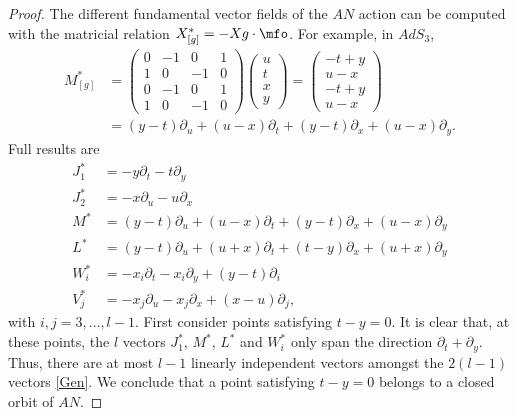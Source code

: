\begin{proof}
	The different fundamental vector fields of the $AN$ action can be computed with the matricial relation $X^*_{[g]}=-Xg\cdot\mfo$. For example, in $AdS_3$,
	\[
		\begin{split}
			M^*_{[g]} & =
			\begin{pmatrix}
				0 & -1 & 0  & 1 \\
				1 & 0  & -1 & 0 \\
				0 & -1 & 0  & 1 \\
				1 & 0  & -1 & 0
			\end{pmatrix}
			\begin{pmatrix}
				u \\t\\x\\y
			\end{pmatrix}
			=
			\begin{pmatrix}
				-t+y \\u-x\\-t+y\\u-x
			\end{pmatrix}                                                          \\
			          & =(y-t)\partial_u+(u-x)\partial_t+(y-t)\partial_x+(u-x)\partial_y.
		\end{split}
	\]
	Full results are
	\begin{subequations}\label{Gen}
		\begin{align}
			J_1^* & =-y\partial_t-t\partial_y							\label{EqNormeJun}                                            \\
			J_2^* & =-x\partial_u-u\partial_x                                                      \label{eq:Jds} \\
			M^*   & =(y-t)\partial_u+(u-x)\partial_t+(y-t)\partial_x+(u-x)\partial_y                              \\
			L^*   & =(y-t)\partial_u+(u+x)\partial_t+(t-y)\partial_x+(u+x)\partial_y                              \\
			W_i^* & =-x_i\partial_t-x_i\partial_y+(y-t)\partial_i                                                 \\
			V_j^* & =-x_j\partial_u-x_j\partial_x+(x-u)\partial_j,
			\label{eq:Vjs}
		\end{align}
	\end{subequations}
	with $i,j=3,\ldots,l-1$.
	First consider points satisfying $t-y=0$. It is clear that, at these points, the $l$ vectors $J_1^*$, $M^*$, $L^*$ and $W_i^*$ only span the direction $\partial_t+\partial_y$. Thus, there are at most $l-1$ linearly independent vectors amongst the $2(l-1)$ vectors \eqref{Gen}. We conclude that a point satisfying $t-y=0$ belongs to a closed orbit of $AN$.


\end{proof}
